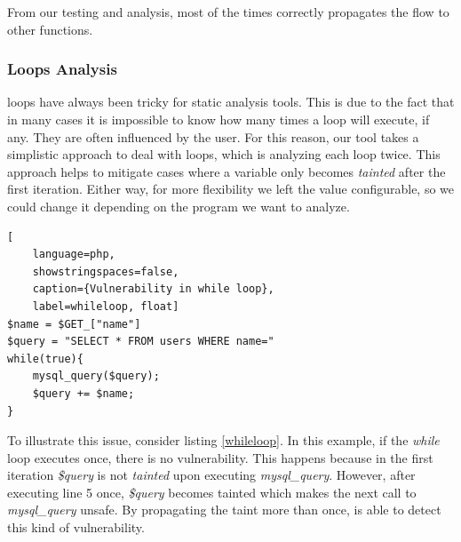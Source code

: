 From our testing and analysis, most of the times \toolname{} correctly propagates the flow to other functions.


\subsubsection{Loops Analysis} loops have always been tricky for static analysis tools. This is due to the fact that in many cases it is impossible to know how many times a loop will execute, if any. They are often influenced by the user. For this reason, our tool takes a simplistic approach to deal with loops, which is analyzing each loop twice. This approach helps to mitigate cases where a variable only becomes \textit{tainted} after the first iteration. Either way, for more flexibility we left the value configurable, so we could change it depending on the program we want to analyze. 

\begin{lstlisting}[
    language=php,
    showstringspaces=false,
    caption={Vulnerability in while loop},
    label=whileloop, float] 
$name = $GET_["name"]    
$query = "SELECT * FROM users WHERE name=" 
while(true){
    mysql_query($query);
    $query += $name;
}
\end{lstlisting}

To illustrate this issue, consider listing \ref{whileloop}. In this example, if the \textit{while} loop executes once, there is no vulnerability. This happens because in the first iteration \textit{\$query} is not \textit{tainted} upon executing \textit{mysql\_query}. However, after executing line 5 once, \textit{\$query} becomes tainted which makes the next call to \textit{mysql\_query} unsafe. By propagating the taint more than once, \toolname{} is able to detect this kind of vulnerability.





